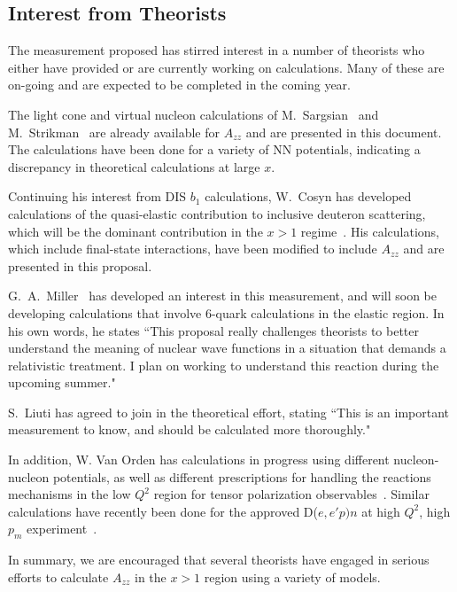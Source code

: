 \subsection{Interest from Theorists}

The measurement proposed has stirred interest in a number of theorists who either have provided or are currently working on calculations. Many of these are on-going and are expected to be completed in the coming year.

The light cone and virtual nucleon calculations of M.~Sargsian~\cite{misak-convo} and M.~Strikman~\cite{strikman-convo} are already available for $A_{zz}$ and are presented in this document. The calculations have been done for a variety of NN potentials, indicating a discrepancy in theoretical calculations at large $x$. 

Continuing his interest from DIS $b_1$ calculations, W.~Cosyn has developed calculations of the quasi-elastic contribution to inclusive deuteron scattering, which will be the dominant contribution in the $x>1$ regime~\cite{cosyn-convo}. His calculations, which include final-state interactions, have been modified to include $A_{zz}$ and are presented in this proposal.

G.~A.~Miller~\cite{miller-convo} has developed an interest in this measurement, and will soon be developing calculations that involve 6-quark calculations in the elastic region. In his own words, he states ``This proposal really challenges theorists to better understand the meaning of nuclear wave functions in a situation that demands a relativistic treatment. I plan on working to understand this reaction during the upcoming summer."

S.~Liuti has agreed to join in the theoretical effort, stating ``This is an important measurement to know, and should be calculated more thoroughly."~\cite{liuti-convo}

In addition, W. Van Orden has calculations in progress using different nucleon-nucleon potentials, as well as different prescriptions for handling the reactions mechanisms in the low $Q^2$ region for tensor polarization observables~\cite{vanorden-convo}.  Similar calculations have recently been done for the approved
D($e,e'p)n$ at high $Q^2$, high $p_m$ experiment~\cite{Ford:2014yua}. 

In summary, we are encouraged that several theorists have engaged in serious efforts to calculate $A_{zz}$ in the $x>1$ region using a variety of models.